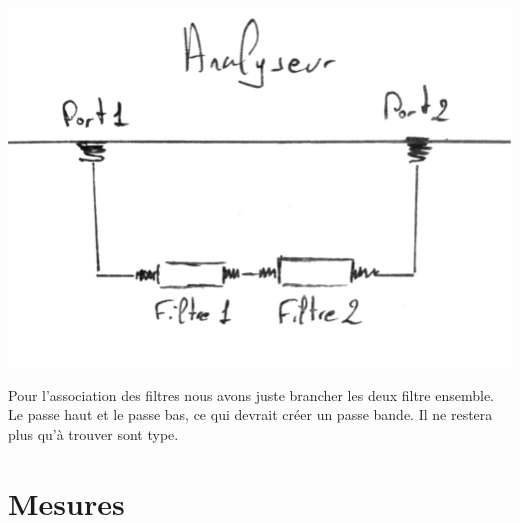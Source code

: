 \documentclass[a4paper,12pt]{report}            %
\begin{document}
\begin{center}\includegraphics[scale = 0.2]{pic/Cablage_filtre2.png}\\ \end{center}
Pour l'association des filtres nous avons juste brancher les deux filtre ensemble. 
Le passe haut et le passe bas, ce qui devrait créer un passe bande. Il ne restera plus
qu'à trouver sont type.
\newpage
\section{Mesures}
\end{document}
